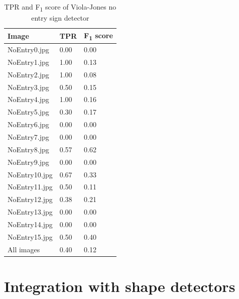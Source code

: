 \documentclass[onecolumn, 10pt, a4paper]{article}
\begin{document}
\begin{table}
  \vspace{-2.5em}
  \begin{center}
  \caption{TPR and F\textsubscript{1} score of Viola-Jones no entry sign detector}\label{tab:vj}
  \begin{tabular}{l | l l} 
    \hline\hline
    Image&TPR&F\textsubscript{1} score\\
    \hline
    NoEntry0.jpg&0.00&0.00\\ 
    NoEntry1.jpg&1.00&0.13\\ 
    NoEntry2.jpg&1.00&0.08\\ 
    NoEntry3.jpg&0.50&0.15\\ 
    NoEntry4.jpg&1.00&0.16\\ 
    NoEntry5.jpg&0.30&0.17\\ 
    NoEntry6.jpg&0.00&0.00\\ 
    NoEntry7.jpg&0.00&0.00\\
    NoEntry8.jpg&0.57&0.62\\ 
    NoEntry9.jpg&0.00&0.00\\ 
    NoEntry10.jpg&0.67&0.33\\ 
    NoEntry11.jpg&0.50&0.11\\ 
    NoEntry12.jpg&0.38&0.21\\ 
    NoEntry13.jpg&0.00&0.00\\ 
    NoEntry14.jpg&0.00&0.00\\ 
    NoEntry15.jpg&0.50&0.40\\ 
    \hdashline
    All images&0.40&0.12\\ 
    \hline
  \end{tabular}
  \end{center}
\end{table} 

\clearpage

\section{Integration with shape detectors}
\end{document}
